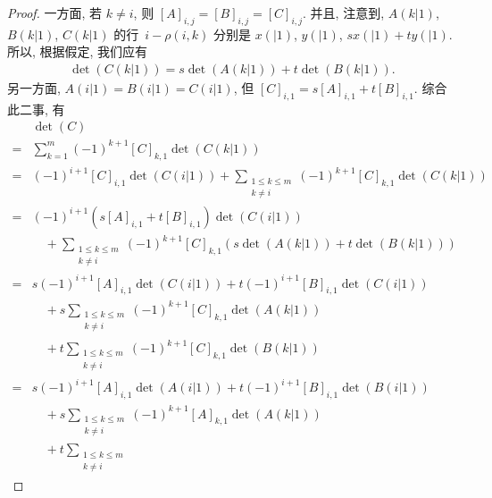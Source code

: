 \documentclass[%
    UTF8,%
    fontset=none,%
    punct=kaiming,%
    zihao=-4,%
    a4paper,%
    oneside,%
]{ctexbook}
\renewcommand*{\leq}{\leqslant}
\begin{document}
\begin{proof}
    一方面, 若 \(k \neq i\), 则
    \([A]_{i,j} = [B]_{i,j} = [C]_{i,j}\).
    并且, 注意到, \(A(k|1)\), \(B(k|1)\), \(C(k|1)\)
    的行~\(i - \rho(i, k)\)
    分别是
    \(x(|1)\),
    \(y(|1)\),
    \(sx(|1) + ty(|1)\).
    所以, 根据假定, 我们应有
    \begin{align*}
        \det {(C(k|1))} = s \det {(A(k|1))} + t \det {(B(k|1))}.
    \end{align*}
    另一方面,
    \(A(i|1) = B(i|1) = C(i|1)\),
    但
    \([C]_{i,1} = s[A]_{i,1} + t[B]_{i,1}\).
    综合此二事, 有
    \begin{align*}
             & \det {(C)}
        \\
        = {} &
        \sum_{k = 1}^{m}
        {(-1)^{k + 1} [C]_{k,1} \det {(C(k|1))}}
        \\
        = {} &
        (-1)^{i + 1} [C]_{i,1} \det {(C(i|1))}
        +
        \sum_{\substack{1 \leq k \leq m     \\k \neq i}}
        {(-1)^{k + 1} [C]_{k,1} \det {(C(k|1))}}
        \\
        = {} &
        (-1)^{i + 1} (s[A]_{i,1} + t[B]_{i,1}) \det {(C(i|1))}
        \\
             &
        \quad
        +
        \sum_{\substack{1 \leq k \leq m     \\k \neq i}}
        {(-1)^{k + 1} [C]_{k,1}
            (s \det {(A(k|1))} + t \det {(B(k|1))})}
        \\
        = {} &
        s (-1)^{i + 1} [A]_{i,1} \det {(C(i|1))}
        + t (-1)^{i + 1} [B]_{i,1} \det {(C(i|1))}
        \\
             & \quad
        + s \sum_{\substack{1 \leq k \leq m \\k \neq i}}
        {(-1)^{k + 1} [C]_{k,1} \det {(A(k|1))}}
        \\
             & \quad
        + t \sum_{\substack{1 \leq k \leq m \\k \neq i}}
        {(-1)^{k + 1} [C]_{k,1} \det {(B(k|1))}}
        \\
        = {} &
        s (-1)^{i + 1} [A]_{i,1} \det {(A(i|1))}
        + t (-1)^{i + 1} [B]_{i,1} \det {(B(i|1))}
        \\
             & \quad
        + s \sum_{\substack{1 \leq k \leq m \\k \neq i}}
        {(-1)^{k + 1} [A]_{k,1} \det {(A(k|1))}}
        \\
             & \quad
        + t \sum_{\substack{1 \leq k \leq m \\k \neq i}}

\end{align*}
\end{proof}
\end{document}
